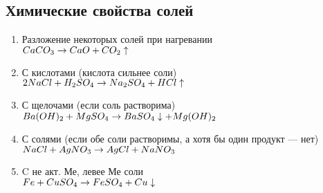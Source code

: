 \subsection{Химические свойства солей}
\begin{enumerate}
    \item Разложение некоторых солей при нагревании\\
        $CaCO_3 \rightarrow CaO + CO_2\uparrow$

    \item С кислотами (кислота сильнее соли)\\
        $2NaCl + H_2SO_4 \rightarrow Na_2SO_4 + HCl\uparrow$

    \item С щелочами (если соль растворима)\\
        $Ba(OH)_2 + MgSO_4 \rightarrow BaSO_4\downarrow + Mg(OH)_2$

    \item С солями (если обе соли растворимы, а хотя бы один продукт --- нет)\\
        $NaCl + AgNO_3 \rightarrow AgCl + NaNO_3$

    \item C не акт. Ме, левее Ме соли\\
        $Fe + CuSO_4 \rightarrow FeSO_4 + Cu\downarrow$
\end{enumerate}
